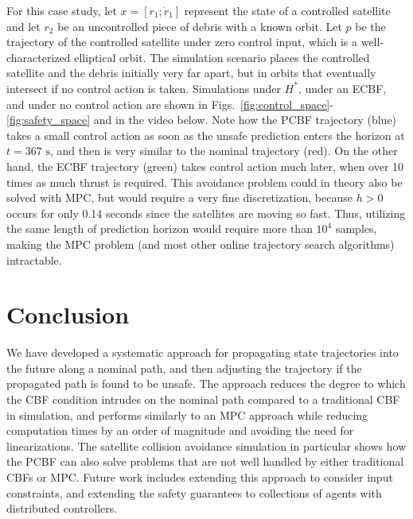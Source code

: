\documentclass[10pt,conference]{ieeeconf}
\newcommand{\todo}[1]{\textcolor{red}{To Do: #1}}
\renewcommand{\(}{\left(}
\renewcommand{\)}{\right)}
\renewcommand{\[}{\left[}
\renewcommand{\]}{\right]}
\newcommand{\regularversion}[1]{\iffalse{}#1\fi}
\newcommand{\extendedversion}[1]{{\color{black}#1}}
\begin{document}
For this case study, let $x = [r_1; \dot{r}_1]$ represent the state of a controlled satellite and let $r_2$ be an uncontrolled piece of debris with a known orbit. Let $p$ be the trajectory of the controlled satellite under zero control input{, which is a well-characterized elliptical orbit}. {The simulation scenario places the controlled satellite and the debris initially very far apart, but in orbits that eventually intersect if no control action is taken.} Simulations under $H^*$, under an ECBF, and under no control action are shown in Figs.~\ref{fig:control_space}-\ref{fig:safety_space} {and in the video below\regularversion{\footnote{\hypertarget{note:satellite}{\url{https://youtu.be/HhtWUG63BWY}}}}}\extendedversion{\hyperlink{note:satellite}{\footnotemark[3]}}. Note how the PCBF trajectory (blue) takes a small control action as soon as the unsafe prediction enters the horizon at $t=367\textrm{ s}$, and then is very similar to the nominal trajectory (red). On the other hand, the ECBF trajectory (green) takes control action much later, when over 10 times as much thrust is required. This avoidance problem could {in theory also} be solved with MPC, but would require a very fine discretization, because $h > 0$ occurs for only 0.14 seconds since the satellites are moving so fast.  {{Thus,} utilizing the same length of prediction horizon} {would require more than $10^4$ samples, making the MPC problem (and most other online trajectory search algorithms) intractable.}


\section{Conclusion} \label{sec:conclusion}

We have developed a systematic approach for propagating state trajectories into the future along a nominal path, and then adjusting the trajectory if the propagated path is found to be unsafe. The approach reduces the degree to which the CBF condition intrudes on the nominal path compared to a traditional CBF in simulation, and performs similarly to an MPC approach while reducing computation times by an order of magnitude and avoiding the need for linearizations. {The satellite collision avoidance simulation in particular shows how the PCBF can also solve problems that are not well handled by either traditional CBFs or MPC.} Future work includes extending this approach to consider input constraints, and extending the safety guarantees to collections of agents with distributed controllers.
\end{document}

